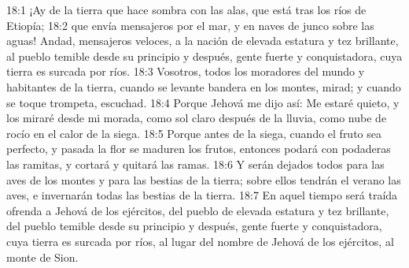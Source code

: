 18:1 ¡Ay de la tierra que hace sombra con las alas, que está tras los ríos de Etiopía; 
18:2 que envía mensajeros por el mar, y en naves de junco sobre las aguas! Andad, mensajeros veloces, a la nación de elevada estatura y tez brillante, al pueblo temible desde su principio y después, gente fuerte y conquistadora, cuya tierra es surcada por ríos. 
18:3 Vosotros, todos los moradores del mundo y habitantes de la tierra, cuando se levante bandera en los montes, mirad; y cuando se toque trompeta, escuchad. 
18:4 Porque Jehová me dijo así: Me estaré quieto, y los miraré desde mi morada, como sol claro después de la lluvia, como nube de rocío en el calor de la siega. 
18:5 Porque antes de la siega, cuando el fruto sea perfecto, y pasada la flor se maduren los frutos, entonces podará con podaderas las ramitas, y cortará y quitará las ramas. 
18:6 Y serán dejados todos para las aves de los montes y para las bestias de la tierra; sobre ellos tendrán el verano las aves, e invernarán todas las bestias de la tierra. 
18:7 En aquel tiempo será traída ofrenda a Jehová de los ejércitos, del pueblo de elevada estatura y tez brillante, del pueblo temible desde su principio y después, gente fuerte y conquistadora, cuya tierra es surcada por ríos, al lugar del nombre de Jehová de los ejércitos, al monte de Sion. 
